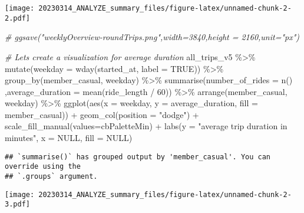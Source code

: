 \documentclass[
]{article}
\newenvironment{Shaded}{\begin{snugshade}}{\end{snugshade}}
\newcommand{\AttributeTok}[1]{\textcolor[rgb]{0.77,0.63,0.00}{#1}}
\newcommand{\CommentTok}[1]{\textcolor[rgb]{0.56,0.35,0.01}{\textit{#1}}}
\newcommand{\ConstantTok}[1]{\textcolor[rgb]{0.00,0.00,0.00}{#1}}
\newcommand{\DecValTok}[1]{\textcolor[rgb]{0.00,0.00,0.81}{#1}}
\newcommand{\FunctionTok}[1]{\textcolor[rgb]{0.00,0.00,0.00}{#1}}
\newcommand{\NormalTok}[1]{#1}
\newcommand{\SpecialCharTok}[1]{\textcolor[rgb]{0.00,0.00,0.00}{#1}}
\newcommand{\StringTok}[1]{\textcolor[rgb]{0.31,0.60,0.02}{#1}}
\begin{document}
\texttt{[image: 20230314\_ANALYZE\_summary\_files/figure-latex/unnamed-chunk-2-2.pdf]}

\begin{Shaded}
\begin{Highlighting}[]
\CommentTok{\# ggsave("weeklyOverview{-}roundTrips.png",width=3840,height = 2160,unit="px")}

\CommentTok{\# Let\textquotesingle{}s create a visualization for average duration}
\NormalTok{all\_trips\_v5 }\SpecialCharTok{\%\textgreater{}\%} 
  \FunctionTok{mutate}\NormalTok{(}\AttributeTok{weekday =} \FunctionTok{wday}\NormalTok{(started\_at, }\AttributeTok{label =} \ConstantTok{TRUE}\NormalTok{)) }\SpecialCharTok{\%\textgreater{}\%} 
  \FunctionTok{group\_by}\NormalTok{(member\_casual, weekday) }\SpecialCharTok{\%\textgreater{}\%} 
  \FunctionTok{summarise}\NormalTok{(}\AttributeTok{number\_of\_rides =} \FunctionTok{n}\NormalTok{()}
\NormalTok{            ,}\AttributeTok{average\_duration =} \FunctionTok{mean}\NormalTok{(ride\_length }\SpecialCharTok{/} \DecValTok{60}\NormalTok{)) }\SpecialCharTok{\%\textgreater{}\%} 
  \FunctionTok{arrange}\NormalTok{(member\_casual, weekday)  }\SpecialCharTok{\%\textgreater{}\%} 
  \FunctionTok{ggplot}\NormalTok{(}\FunctionTok{aes}\NormalTok{(}\AttributeTok{x =}\NormalTok{ weekday, }\AttributeTok{y =}\NormalTok{ average\_duration, }\AttributeTok{fill =}\NormalTok{ member\_casual)) }\SpecialCharTok{+}
  \FunctionTok{geom\_col}\NormalTok{(}\AttributeTok{position =} \StringTok{"dodge"}\NormalTok{) }\SpecialCharTok{+} 
  \FunctionTok{scale\_fill\_manual}\NormalTok{(}\AttributeTok{values=}\NormalTok{cbPaletteMin) }\SpecialCharTok{+}
  \FunctionTok{labs}\NormalTok{(}\AttributeTok{y =} \StringTok{"average trip duration in minutes"}\NormalTok{, }\AttributeTok{x =} \ConstantTok{NULL}\NormalTok{, }\AttributeTok{fill =} \ConstantTok{NULL}\NormalTok{)}
\end{Highlighting}
\end{Shaded}

\begin{verbatim}
## `summarise()` has grouped output by 'member_casual'. You can override using the
## `.groups` argument.
\end{verbatim}

\texttt{[image: 20230314\_ANALYZE\_summary\_files/figure-latex/unnamed-chunk-2-3.pdf]}
\end{document}
